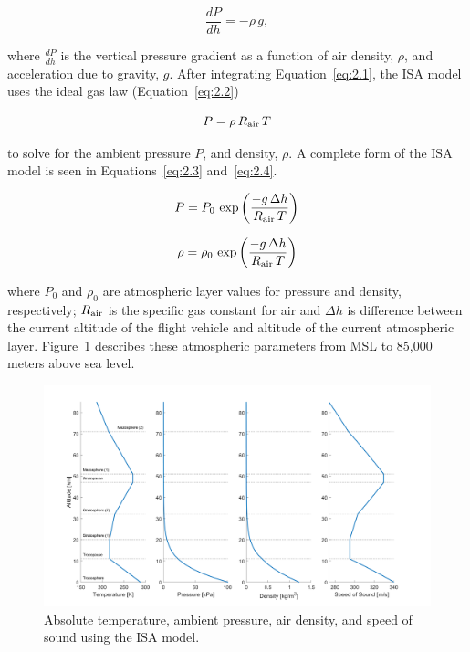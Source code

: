 \begin{equation}
    \frac{dP}{dh} = -\rho \, g,
    \label{eq:2.1}
\end{equation}

where \(\frac{dP}{dh}\) is the vertical pressure gradient as a function of air density, \( \rho \), and acceleration due to gravity, \(g\). After integrating Equation~\ref{eq:2.1}, the ISA model uses the ideal gas law (Equation~\ref{eq:2.2})

\begin{equation}
    P = \rho \, R\textsubscript{air} \, T
    \label{eq:2.2}
\end{equation}

to solve for the ambient pressure \(P\), and density, \( \rho \). A complete form of the ISA model is seen in Equations~\ref{eq:2.3} and~\ref{eq:2.4}.

\begin{equation}
    P = P_0\,\exp\left({\frac{-g\,\Delta h}{R\textsubscript{air}\,T}}\right)
    \label{eq:2.3}
\end{equation}

\begin{equation}
    \rho = \rho_0\,\exp\left({\frac{-g\,\Delta h}{R\textsubscript{air}\,T}}\right)
    \label{eq:2.4}
\end{equation}

where \(P_0\) and \(\rho_0\) are atmospheric layer values for pressure and density, respectively; \(R\textsubscript{air}\) is the specific gas constant for air and \(\Delta h\) is difference between the current altitude of the flight vehicle and altitude of the current atmospheric layer. Figure~\ref{fig:atmos} describes these atmospheric parameters from MSL to 85,000 meters above sea level.
\begin{figure}
    \centering
    \includegraphics[width=\linewidth]{Figures/atmosphericparameters.png}
    \caption{Absolute temperature, ambient pressure, air density, and speed of sound using the ISA model.}\label{fig:atmos}
\end{figure}

